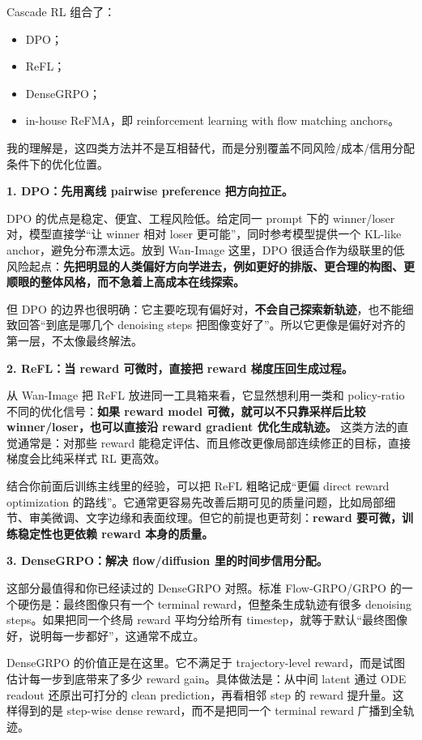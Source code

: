Cascade RL 组合了：

\begin{itemize}[leftmargin=1.5em]
  \item DPO；
  \item ReFL；
  \item DenseGRPO；
  \item in-house ReFMA，即 reinforcement learning with flow matching anchors。
\end{itemize}

我的理解是，这四类方法并不是互相替代，而是分别覆盖不同风险/成本/信用分配条件下的优化位置。

\textbf{1. DPO：先用离线 pairwise preference 把方向拉正。}

DPO 的优点是稳定、便宜、工程风险低。给定同一 prompt 下的 winner/loser 对，模型直接学“让 winner 相对 loser 更可能”，同时参考模型提供一个 KL-like anchor，避免分布漂太远。放到 Wan-Image 这里，DPO 很适合作为级联里的低风险起点：\textbf{先把明显的人类偏好方向学进去，例如更好的排版、更合理的构图、更顺眼的整体风格，而不急着上高成本在线探索。}

但 DPO 的边界也很明确：它主要吃现有偏好对，\textbf{不会自己探索新轨迹}，也不能细致回答“到底是哪几个 denoising steps 把图像变好了”。所以它更像是偏好对齐的第一层，不太像最终解法。

\textbf{2. ReFL：当 reward 可微时，直接把 reward 梯度压回生成过程。}

从 Wan-Image 把 ReFL 放进同一工具箱来看，它显然想利用一类和 policy-ratio 不同的优化信号：\textbf{如果 reward model 可微，就可以不只靠采样后比较 winner/loser，也可以直接沿 reward gradient 优化生成轨迹。} 这类方法的直觉通常是：对那些 reward 能稳定评估、而且修改更像局部连续修正的目标，直接梯度会比纯采样式 RL 更高效。

结合你前面后训练主线里的经验，可以把 ReFL 粗略记成“更偏 direct reward optimization 的路线”。它通常更容易先改善后期可见的质量问题，比如局部细节、审美微调、文字边缘和表面纹理。但它的前提也更苛刻：\textbf{reward 要可微，训练稳定性也更依赖 reward 本身的质量。}

\textbf{3. DenseGRPO：解决 flow/diffusion 里的时间步信用分配。}

这部分最值得和你已经读过的 DenseGRPO 对照。标准 Flow-GRPO/GRPO 的一个硬伤是：最终图像只有一个 terminal reward，但整条生成轨迹有很多 denoising steps。如果把同一个终局 reward 平均分给所有 timestep，就等于默认“最终图像好，说明每一步都好”，这通常不成立。

DenseGRPO 的价值正是在这里。它不满足于 trajectory-level reward，而是试图估计每一步到底带来了多少 reward gain。具体做法是：从中间 latent 通过 ODE readout 还原出可打分的 clean prediction，再看相邻 step 的 reward 提升量。这样得到的是 step-wise dense reward，而不是把同一个 terminal reward 广播到全轨迹。

